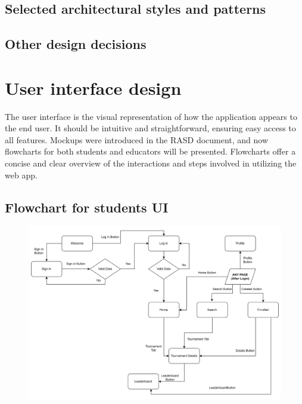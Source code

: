 \documentclass[12pt, a4paper]{report}
\begin{document}
    \section{Selected architectural styles and patterns}
    \section{Other design decisions}

\newpage 

\chapter{User interface design}
    The user interface is the visual representation of how the application appears to the end user.
    It should be intuitive and straightforward, ensuring easy access to all features.
    Mockups were introduced in the RASD document, and now flowcharts for both students and educators will be presented.
    Flowcharts offer a concise and clear overview of the interactions and steps involved in utilizing the web app.
    \section{Flowchart for students UI}
    \begin{figure}[H]
        \centering\includegraphics[width=0.9\linewidth]{images/students_UI.png}
    \end{figure}
\end{document}
